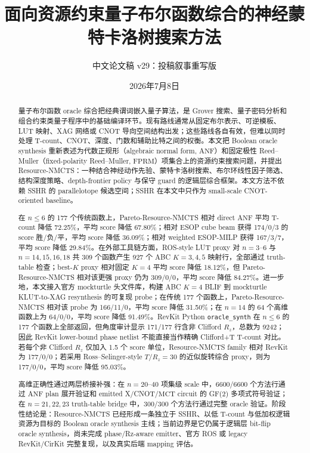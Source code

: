 \documentclass[UTF8,fontset=macnew,11pt]{ctexart}
\title{面向资源约束量子布尔函数综合的神经蒙特卡洛树搜索方法}
\author{中文论文稿 v29：投稿叙事重写版}
\date{2026年7月8日}
\newcommand{\method}{Resource-NMCTS}
\newcommand{\anf}{\ensuremath{\mathrm{ANF}}}
\newcommand{\fprm}{\ensuremath{\mathrm{FPRM}}}
\newcommand{\mct}{\ensuremath{\mathrm{MCT}}}
\newcommand{\rz}{\ensuremath{R_z}}
\newcommand{\ttable}{truth-table}
\begin{document}
\pagestyle{plain}
\maketitle

\begin{abstract}
量子布尔函数 oracle 综合把经典谓词嵌入量子算法，是 Grover 搜索、量子密码分析和组合约束类量子程序中的基础编译环节。现有路线通常从固定布尔表示、可逆模板、LUT 映射、XAG 网络或 CNOT 导向空间结构出发；这些路线各自有效，但难以同时处理 T-count、CNOT、深度、门数和辅助比特之间的权衡。本文把 Boolean oracle synthesis 重新表述为代数正规形（algebraic normal form, \anf{}）和固定极性 Reed--Muller（fixed-polarity Reed--Muller, \fprm{}）项集合上的资源约束搜索问题，并提出 \method{}：一种结合神经动作先验、蒙特卡洛树搜索、布尔环线性因子筛选、结构深度策略、depth-frontier policy 与保守 guard 的逻辑层综合框架。本文方法不依赖 SSHR 的 parallelotope 候选空间；SSHR 在本文中只作为 small-scale CNOT-oriented baseline。

在 $n\leq6$ 的 177 个传统函数上，Pareto-\method{} 相对 direct \anf{} 平均 T-count 降低 72.25\%，平均 score 降低 67.80\%；相对 ESOP cube beam 获得 174/0/3 的 score 胜/负/平，平均 score 降低 36.09\%；相对 weighted ESOP-MILP 获得 167/3/7，平均 score 降低 29.84\%。在外部工具链方面，ROS-style LUT proxy 对 $n=3$--$6$ 与 $n=14,15,16,18$ 共 309 个函数产生 927 个 ABC $K=3,4,5$ 映射行，全部通过 \ttable{} 检查；best-$K$ proxy 相对固定 $K=4$ 平均 score 降低 18.12\%，但 Pareto-\method{} 相对该更强 proxy 仍为 309/0/0，平均 score 降低 84.27\%。进一步地，本文接入官方 mockturtle 头文件库，构建 ABC $K=4$ BLIF 到 mockturtle KLUT-to-XAG resynthesis 的可复现 probe；在传统 177 个函数上，Pareto-\method{} 相对该 probe 为 166/11/0，平均 score 降低 31.50\%；在 $n=14$ 的 64 个高维函数上为 64/0/0，平均 score 降低 91.49\%。RevKit Python \texttt{oracle\_synth} 在 $n\leq6$ 的 177 个函数上全部返回，但角度审计显示 171/177 行含非 Clifford \rz{}，总数为 9242；因此 RevKit lower-bound phase netlist 不能直接当作精确 Clifford+T T-count 对比。若每个非 Clifford \rz{} 仅加入 1.5 个 score 单位，Resource-NMCTS family 相对 RevKit 为 177/0/0；若采用 Ross--Selinger-style $T/R_z=30$ 的近似旋转综合 proxy，则为 177/0/0，平均 score 降低 95.03\%。

高维正确性通过两层桥接补强：在 $n=20$--$40$ 项集级 scale 中，6600/6600 个方法行通过 \anf{} plan 展开验证和 emitted X/CNOT/\mct{} circuit 的 GF(2) 多项式符号验证；在 $n=21,22,23$ truth-table bridge 中，300/300 个方法行通过完整 oracle 验证。阶段性结论是：\method{} 已经形成一条独立于 SSHR、以低 T-count 与低加权逻辑资源为目标的 Boolean oracle synthesis 主线；当前边界是它仍属于逻辑层 bit-flip oracle synthesis，尚未完成 phase/Rz-aware emitter、官方 ROS 或 legacy RevKit/CirKit 完整复现，以及真实后端 mapping 评估。
\end{abstract}
\end{document}
